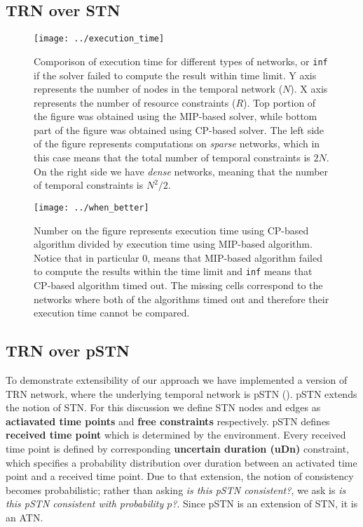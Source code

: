 \documentclass{article}
\begin{document}
\begin{multicols}{2}
\subsection{TRN over STN}

\begin{figure*}
\begin{center}
\texttt{[image: ../execution\_time]}
\caption{Comporison of execution time for different types of networks, or \texttt{inf} if the solver failed to compute the result within time limit. Y axis represents the number of nodes in the temporal network ($N$). X axis represents the number of resource constraints ($R$). Top portion of the figure was obtained using the MIP-based solver, while bottom part of the figure was obtained using CP-based solver. The left side of the figure represents computations on \textit{sparse} networks, which in this case means that the total number of temporal constraints is $2N$. On the right side we have \textit{dense} networks, meaning that the number of temporal constraints is $N^2/2$.}
\label{fig:execution_time}
\end{center}
\end{figure*}

\begin{figure*}
\begin{center}
\texttt{[image: ../when\_better]}
\caption{Number on the figure represents execution time using CP-based algorithm divided by execution time using MIP-based algorithm. Notice that in particular $0$, means that MIP-based algorithm failed to compute the results within the time limit and \texttt{inf} means that CP-based algorithm timed out. The missing cells correspond to the networks where both of the algorithms timed out and therefore their execution time cannot be compared.   }
\label{fig:when_better}
\end{center}
\end{figure*}


\subsection{TRN over pSTN}
To demonstrate extensibility of our approach we have implemented a version of TRN network, where the underlying temporal network is pSTN (\cite{Fang2014}). pSTN extends the notion of STN. For this discussion we define STN nodes and edges as \textbf{actiavated time points} and \textbf{free constraints} respectively. pSTN defines \textbf{received time point} which is determined by the environment. Every received time point is defined by corresponding \textbf{uncertain duration (uDn)} constraint, which specifies a probability distribution over duration between an activated time point and a received time point. Due to that extension, the notion of consistency becomes probabilistic; rather than asking \textit{is this pSTN consistent?}, we ask is \textit{is this pSTN consistent with probability $p$?}. Since pSTN is an extension of STN, it is an ATN.


\end{multicols}
\end{document}
